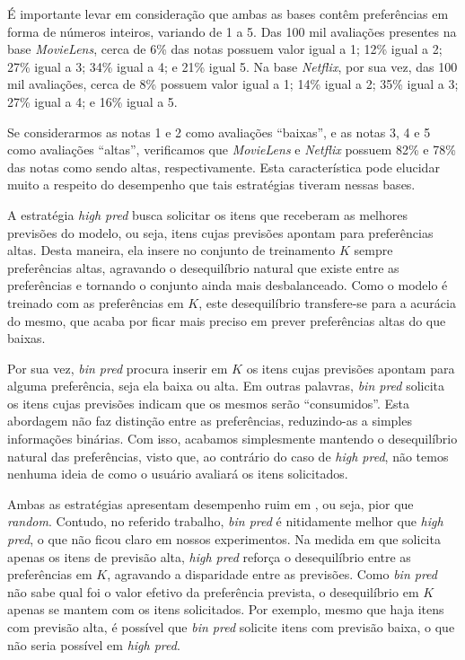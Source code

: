 É importante levar em consideração que ambas as bases contêm preferências em forma de números inteiros, variando de 1 a 5. Das 100 mil avaliações presentes na base \textit{MovieLens}, cerca de 6\% das notas possuem valor igual a 1; 12\% igual a 2; 27\% igual a 3; 34\% igual a 4; e 21\% igual 5. Na base \textit{Netflix}, por sua vez, das 100 mil avaliações, cerca de 8\% possuem valor igual a 1; 14\% igual a 2; 35\% igual a 3; 27\% igual a 4; e 16\% igual a 5.

Se considerarmos as notas 1 e 2 como avaliações ``baixas'', e as notas 3, 4 e 5 como avaliações ``altas'', verificamos que \textit{MovieLens} e \textit{Netflix} possuem 82\% e 78\% das notas como sendo altas, respectivamente. Esta característica pode elucidar muito a respeito do desempenho que tais estratégias tiveram nessas bases.

A estratégia \textit{high pred} busca solicitar os itens que receberam as melhores previsões do modelo, ou seja, itens cujas previsões apontam para preferências altas. Desta maneira, ela insere no conjunto de treinamento $K$ sempre preferências altas, agravando o desequilíbrio natural que existe entre as preferências e tornando o conjunto ainda mais desbalanceado. Como o modelo é treinado com as preferências em $K$, este desequilíbrio transfere-se para a acurácia do mesmo, que acaba por ficar mais preciso em prever preferências altas do que baixas.

Por sua vez, \textit{bin pred} procura inserir em $K$ os itens cujas previsões apontam para alguma preferência, seja ela baixa ou alta. Em outras palavras, \textit{bin pred} solicita os itens cujas previsões indicam que os mesmos serão ``consumidos''. Esta abordagem não faz distinção entre as preferências, reduzindo-as a simples informações binárias. Com isso, acabamos simplesmente mantendo o desequilíbrio natural das preferências, visto que, ao contrário do caso de \textit{high pred}, não temos nenhuma ideia de como o usuário avaliará os itens solicitados.

Ambas as estratégias apresentam desempenho ruim em \citep{Elahi:2014:ALS:2542182.2542195}, ou seja, pior que \textit{random}. Contudo, no referido trabalho, \textit{bin pred} é nitidamente melhor que \textit{high pred}, o que não ficou claro em nossos experimentos. Na medida em que solicita apenas os itens de previsão alta, \textit{high pred} reforça o desequilíbrio entre as preferências em $K$, agravando a disparidade entre as previsões. Como \textit{bin pred} não sabe qual foi o valor efetivo da preferência prevista, o desequilíbrio em $K$ apenas se mantem com os itens solicitados. Por exemplo, mesmo que haja itens com previsão alta, é possível que \textit{bin pred} solicite itens com previsão baixa, o que não seria possível em \textit{high pred}.  

